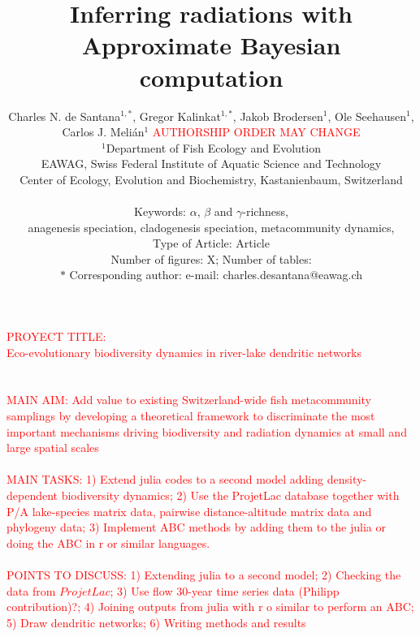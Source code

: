 \documentclass[11pt]{article}
\newcommand{\carlos}[1]{\textcolor{Red}{#1}}
\begin{document}
\title{{\bf Inferring radiations with Approximate Bayesian
    computation}} \author{Charles N. de
  Santana$^{1,*}$, Gregor Kalinkat$^{1,*}$, Jakob Brodersen$^{1}$, Ole Seehausen$^{1}$,\\
  Carlos J. Meli\'an$^{1}$ \carlos{AUTHORSHIP ORDER MAY CHANGE}\\
  $^1$Department of Fish Ecology and Evolution \\
  EAWAG, Swiss Federal Institute of Aquatic Science and Technology\\
  Center of Ecology, Evolution and Biochemistry, Kastanienbaum, Switzerland\\
  \\
  Keywords: $\alpha$, $\beta$ and $\gamma$-richness,\\
  anagenesis speciation, cladogenesis speciation, metacommunity dynamics,\\
  Type of Article: Article\\
  Number of figures: X; Number of tables: \\
  $\ast$ Corresponding author: e-mail: charles.desantana@eawag.ch}
\carlos{PROYECT TITLE: \\ Eco-evolutionary biodiversity
  dynamics in river-lake dendritic networks\\
  \\
  \\
  MAIN AIM: Add value to existing Switzerland-wide fish metacommunity
  samplings by developing a theoretical framework to discriminate the
  most important mechanisms driving biodiversity and radiation
  dynamics at small and large spatial scales
  \\
  \\
  MAIN TASKS: 1) Extend julia codes to a second model adding
  density-dependent biodiversity dynamics; 2) Use the ProjetLac
  database together with P/A lake-species matrix data, pairwise
  distance-altitude matrix data and phylogeny data; 3) Implement ABC
  methods by adding them to the julia or doing the ABC in r or similar
  languages.
  \\
  \\
  POINTS TO DISCUSS: 1) Extending julia to a second model; 2) Checking
  the data from $ProjetLac$; 3) Use flow 30-year time series data
  (Philipp contribution)?; 4) Joining outputs from julia with r o
  similar to perform an ABC; 5) Draw dendritic networks; 6) Writing methods and results}
\date{}
\end{document}
